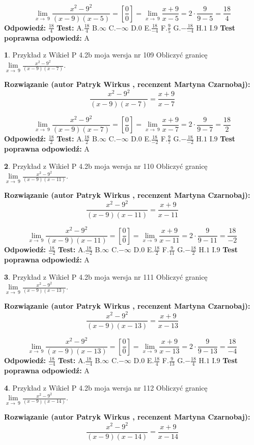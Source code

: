 \documentclass[12pt, a4paper]{article}
\theoremstyle{definition} %
\newtheorem{zad}{}
\newcommand{\zadStart}[1]{\begin{zad}#1\newline}
\newcommand{\zadStop}{\end{zad}}
\newcommand{\rozwStart}[2]{\noindent \textbf{Rozwiązanie (autor #1 , recenzent #2): }\newline}
\newcommand{\rozwStop}{\newline}
\newcommand{\odpStart}{\noindent \textbf{Odpowiedź:}\newline}
\newcommand{\odpStop}{\newline}
\newcommand{\testStart}{\noindent \textbf{Test:}\newline}
\newcommand{\testStop}{\newline}
\newcommand{\kluczStart}{\noindent \textbf{Test poprawna odpowiedź:}\newline}
\newcommand{\kluczStop}{\newline}
\begin{document}
$$\lim\limits_{x\to\ 9}\frac{x^{2}-9^{2}}{(x-9)(x-5)}=[\frac{0}{0}]=\lim\limits_{x\to\ 9}\frac{x+9}{x-5}=2 \cdot \frac{9}{9-5} = \frac{18}{4}$$
\rozwStop
\odpStart
$\frac{18}{4}$
\odpStop
\testStart
A.$\frac{18}{4}$
B.$\infty$
C.$-\infty$
D.$0$
E.$\frac{18}{-4}$
F.$\frac{9}{5}$
G.$-\frac{18}{-4}$
H.$1$
I.$9$
\testStop
\kluczStart
A
\kluczStop



\zadStart{Przykład z Wikieł P 4.2b moja wersja nr 109}
Obliczyć granicę $\lim\limits_{x\to\ 9}\frac{x^{2}-9^{2}}{(x-9)(x-7)}$.
\zadStop
\rozwStart{Patryk Wirkus}{Martyna Czarnobaj}
$$\frac{x^{2}-9^{2}}{(x-9)(x-7)}=\frac{x+9}{x-7}$$

$$\lim\limits_{x\to\ 9}\frac{x^{2}-9^{2}}{(x-9)(x-7)}=[\frac{0}{0}]=\lim\limits_{x\to\ 9}\frac{x+9}{x-7}=2 \cdot \frac{9}{9-7} = \frac{18}{2}$$
\rozwStop
\odpStart
$\frac{18}{2}$
\odpStop
\testStart
A.$\frac{18}{2}$
B.$\infty$
C.$-\infty$
D.$0$
E.$\frac{18}{-2}$
F.$\frac{9}{7}$
G.$-\frac{18}{-2}$
H.$1$
I.$9$
\testStop
\kluczStart
A
\kluczStop



\zadStart{Przykład z Wikieł P 4.2b moja wersja nr 110}
Obliczyć granicę $\lim\limits_{x\to\ 9}\frac{x^{2}-9^{2}}{(x-9)(x-11)}$.
\zadStop
\rozwStart{Patryk Wirkus}{Martyna Czarnobaj}
$$\frac{x^{2}-9^{2}}{(x-9)(x-11)}=\frac{x+9}{x-11}$$

$$\lim\limits_{x\to\ 9}\frac{x^{2}-9^{2}}{(x-9)(x-11)}=[\frac{0}{0}]=\lim\limits_{x\to\ 9}\frac{x+9}{x-11}=2 \cdot \frac{9}{9-11} = \frac{18}{-2}$$
\rozwStop
\odpStart
$\frac{18}{-2}$
\odpStop
\testStart
A.$\frac{18}{-2}$
B.$\infty$
C.$-\infty$
D.$0$
E.$\frac{18}{2}$
F.$\frac{9}{11}$
G.$-\frac{18}{2}$
H.$1$
I.$9$
\testStop
\kluczStart
A
\kluczStop



\zadStart{Przykład z Wikieł P 4.2b moja wersja nr 111}
Obliczyć granicę $\lim\limits_{x\to\ 9}\frac{x^{2}-9^{2}}{(x-9)(x-13)}$.
\zadStop
\rozwStart{Patryk Wirkus}{Martyna Czarnobaj}
$$\frac{x^{2}-9^{2}}{(x-9)(x-13)}=\frac{x+9}{x-13}$$

$$\lim\limits_{x\to\ 9}\frac{x^{2}-9^{2}}{(x-9)(x-13)}=[\frac{0}{0}]=\lim\limits_{x\to\ 9}\frac{x+9}{x-13}=2 \cdot \frac{9}{9-13} = \frac{18}{-4}$$
\rozwStop
\odpStart
$\frac{18}{-4}$
\odpStop
\testStart
A.$\frac{18}{-4}$
B.$\infty$
C.$-\infty$
D.$0$
E.$\frac{18}{4}$
F.$\frac{9}{13}$
G.$-\frac{18}{4}$
H.$1$
I.$9$
\testStop
\kluczStart
A
\kluczStop



\zadStart{Przykład z Wikieł P 4.2b moja wersja nr 112}
Obliczyć granicę $\lim\limits_{x\to\ 9}\frac{x^{2}-9^{2}}{(x-9)(x-14)}$.
\zadStop
\rozwStart{Patryk Wirkus}{Martyna Czarnobaj}
$$\frac{x^{2}-9^{2}}{(x-9)(x-14)}=\frac{x+9}{x-14}$$
\end{document}
